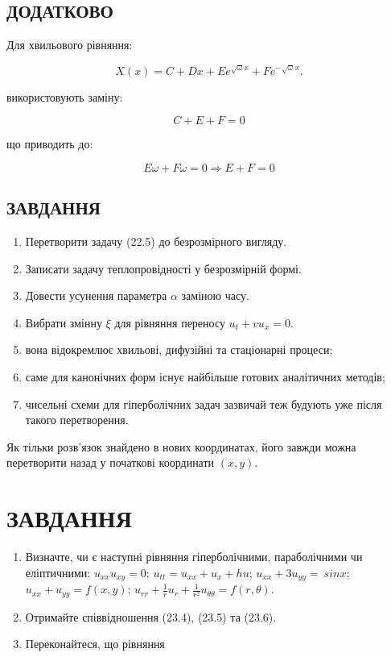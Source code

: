 \documentclass[
  ukrainian,
]{article}
\providecommand{\tightlist}{%
  \setlength{\itemsep}{0pt}\setlength{\parskip}{0pt}}
\begin{document}
\subsection{ДОДАТКОВО}\label{ux434ux43eux434ux430ux442ux43aux43eux432ux43e}

Для хвильового рівняння:

\[
X(x) = C + Dx + E e^{\sqrt{\omega}x} + F e^{-\sqrt{\omega}x}.
\]

використовують заміну:

\[
C + E + F = 0
\]

що приводить до:

\[
E\omega + F\omega = 0 \Rightarrow E + F = 0
\]

\subsection{ЗАВДАННЯ}\label{ux437ux430ux432ux434ux430ux43dux43dux44f-15}

\begin{enumerate}
\def\labelenumi{\arabic{enumi}.}
\tightlist
\item
  Перетворити задачу (22.5) до безрозмірного вигляду.
\item
  Записати задачу теплопровідності у безрозмірній формі.
\item
  Довести усунення параметра \(\alpha\) заміною часу.
\item
  Вибрати змінну \(\xi\) для рівняння переносу \(u_t + v u_x = 0\).
\item
  вона відокремлює хвильові, дифузійні та стаціонарні процеси;
\item
  саме для канонічних форм існує найбільше готових аналітичних методів;
\item
  чисельні схеми для гіперболічних задач зазвичай теж будують уже після
  такого перетворення.
\end{enumerate}

Як тільки розв'язок знайдено в нових координатах, його завжди можна
перетворити назад у початкові координати \((x,y)\).

\section{ЗАВДАННЯ}\label{ux437ux430ux432ux434ux430ux43dux43dux44f-16}

\begin{enumerate}
\def\labelenumi{\arabic{enumi}.}
\item
  Визначте, чи є наступні рівняння гіперболічними, параболічними чи
  еліптичними: \(u_{xx}u_{xy}=0\); \(u_{tt}=u_{xx}+u_x+hu\);
  \(u_{xx}+3u_{yy}=\ sin x\); \(u_{xx}+u_{yy}=f(x,y)\);
  \(u_{rr}+\frac{1}{r}u_r+\frac{1}{r^2}u_{\theta\theta}=f(r,\theta)\).
\item
  Отримайте співвідношення (23.4), (23.5) та (23.6).
\item
  Переконайтеся, що рівняння
\end{enumerate}
\end{document}
